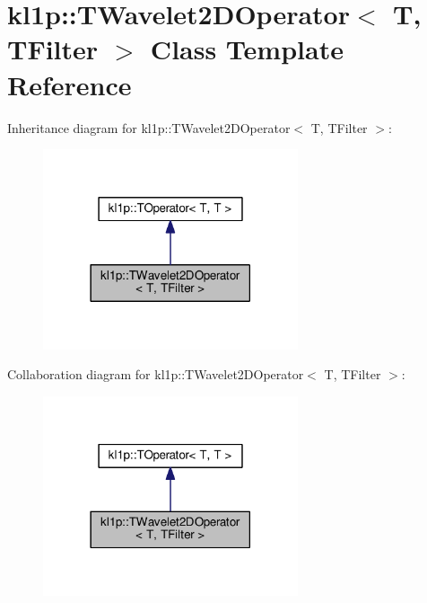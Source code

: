 \hypertarget{classkl1p_1_1TWavelet2DOperator}{}\section{kl1p\+:\+:T\+Wavelet2\+D\+Operator$<$ T, T\+Filter $>$ Class Template Reference}
\label{classkl1p_1_1TWavelet2DOperator}


Inheritance diagram for kl1p\+:\+:T\+Wavelet2\+D\+Operator$<$ T, T\+Filter $>$\+:
\nopagebreak
\begin{figure}[H]
\begin{center}
\leavevmode
\includegraphics[width=213pt]{classkl1p_1_1TWavelet2DOperator__inherit__graph}
\end{center}
\end{figure}


Collaboration diagram for kl1p\+:\+:T\+Wavelet2\+D\+Operator$<$ T, T\+Filter $>$\+:
\nopagebreak
\begin{figure}[H]
\begin{center}
\leavevmode
\includegraphics[width=213pt]{classkl1p_1_1TWavelet2DOperator__coll__graph}
\end{center}
\end{figure}

